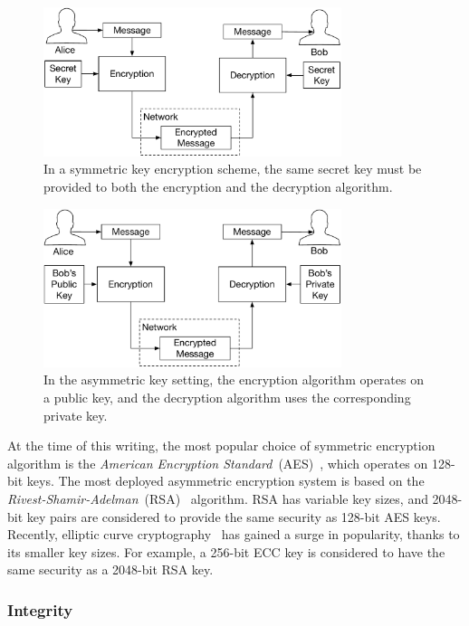 \begin{figure}[hbt]
  \centering
  \includegraphics[width=87mm]{figures/symmetric_encryption.pdf}
  \caption{
    In a symmetric key encryption scheme, the same secret key must be provided
    to both the encryption and the decryption algorithm.
  }
  \label{fig:symmetric_encryption}
\end{figure}

\begin{figure}[hbt]
  \centering
  \includegraphics[width=87mm]{figures/asymmetric_encryption.pdf}
  \caption{
    In the asymmetric key setting, the encryption algorithm operates on a
    public key, and the decryption algorithm uses the corresponding private
    key.
  }
  \label{fig:asymmetric_encryption}
\end{figure}

At the time of this writing, the most popular choice of symmetric encryption
algorithm is the
\textit{American Encryption Standard}~(AES)~\cite{daemen1999aes}, which
operates on 128-bit keys. The most deployed asymmetric encryption system is
based on the \textit{Rivest-Shamir-Adelman}~(RSA)~\cite{rivest1978rsa}
algorithm. RSA has variable key sizes, and 2048-bit key pairs are considered to
provide the same security as 128-bit AES keys. Recently, elliptic curve
cryptography~\cite{koblitz1987ecc} has gained a surge in popularity, thanks to
its smaller key sizes. For example, a 256-bit ECC key is considered to have the
same security as a 2048-bit RSA key.


\subsubsection{Integrity}

